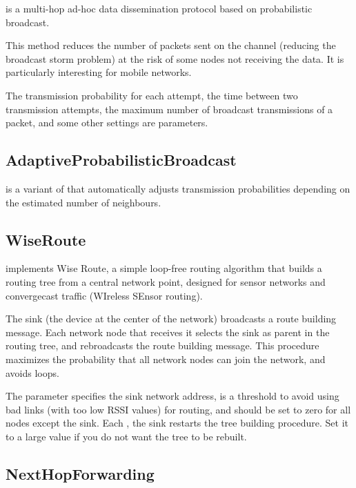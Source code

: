  is a multi-hop ad-hoc data dissemination 
protocol based on probabilistic broadcast.

This method reduces the number of packets sent on the channel (reducing the
broadcast storm problem) at the risk of some nodes not receiving the data.
It is particularly interesting for mobile networks.

The transmission probability for each attempt, the time between two transmission
attempts, the maximum number of broadcast transmissions of a packet, and
some other settings are parameters.

\subsection{AdaptiveProbabilisticBroadcast}

 is a variant of
 that automatically adjusts transmission
probabilities depending on the estimated number of neighbours.

\subsection{WiseRoute}

 implements Wise Route, a simple loop-free routing algorithm
that builds a routing tree from a central network point, designed for sensor
networks and convergecast traffic (WIreless SEnsor routing).

The sink (the device at the center of the network) broadcasts a route building
message. Each network node that receives it selects the sink as parent in the
routing tree, and rebroadcasts the route building message. This procedure
maximizes the probability that all network nodes can join the network, and
avoids loops.

The  parameter specifies the sink network address,
 is a threshold to avoid using bad links (with too low RSSI
values) for routing, and  should be set to zero for
all nodes except the sink. Each , the sink restarts
the tree building procedure. Set it to a large value if you do not want the tree
to be rebuilt.

\subsection{NextHopForwarding}

